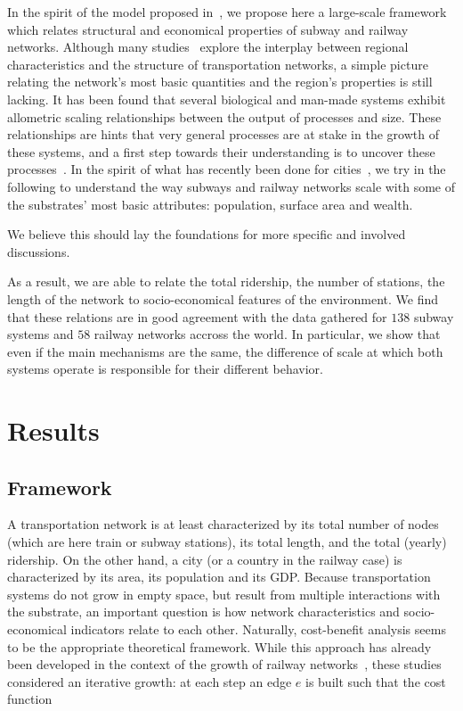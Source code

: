 In the spirit of the model proposed in~\cite{Louf:2013_emergence}, we propose here a
large-scale framework which relates structural and economical properties of
subway and railway networks. Although many
studies~\cite{Kansky:1963,Derrible:2009,Levinson:2012} explore the interplay
between regional characteristics and the structure of transportation networks, a
simple picture relating the network's most basic quantities and the region's
properties is still lacking. It has been found that several biological and
man-made systems exhibit allometric scaling relationships between the output of
processes and size. These relationships are hints that very general processes
are at stake in the growth of these systems, and a first step towards their
understanding is to uncover these
processes~\cite{Banavar:1999,Louf:2014_mobility}. In
the spirit of what has recently been done for cities~\cite{Louf:2014_mobility}, we try in
the following to understand the way subways and railway networks scale with some
of the substrates' most basic attributes: population, surface area and wealth. 

We believe this should lay the foundations for more specific and involved discussions.

As a result, we are able to relate the total ridership, the number of stations,
the length of the network to socio-economical features of the environment. We
find that these relations are in good agreement with the data gathered for $138$
subway systems and $58$ railway networks accross the world. In particular, we
show that even if the main mechanisms are the same, the difference of scale at
which both systems operate is responsible for their different behavior. 


\section*{Results}

\subsection*{Framework}

A transportation network is at least characterized by its total number of nodes
(which are here train or subway stations), its total length, and the total
(yearly) ridership. On the other hand, a city (or a country in the railway case)
is characterized by its area, its population and its GDP. Because transportation
systems do not grow in empty space, but result from multiple interactions with
the substrate, an important question is how network characteristics and
socio-economical indicators relate to each other. Naturally, cost-benefit
analysis seems to be the appropriate theoretical framework. While this approach
has already been developed in the context of the growth of railway
networks~\cite{Black:1971,Louf:2013_emergence}, these studies considered an iterative
growth: at each step an edge $e$ is built such that the cost function

